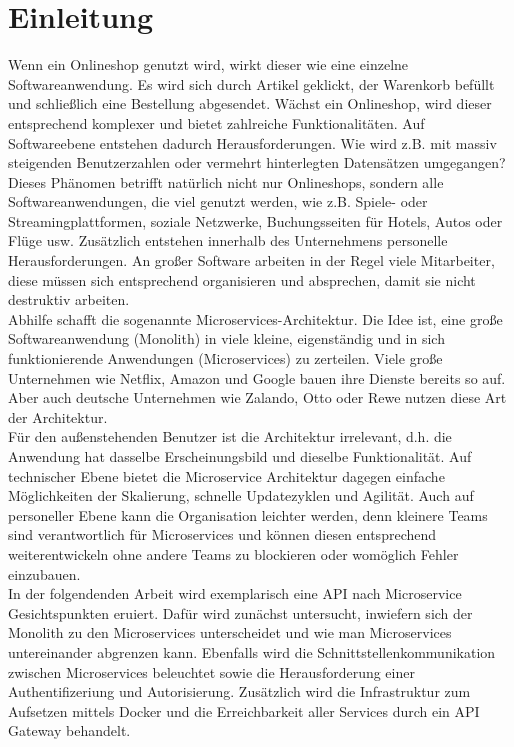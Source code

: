 \section{Einleitung}\label{sec:einleitung}

Wenn ein Onlineshop genutzt wird, wirkt dieser wie eine einzelne Softwareanwendung. Es wird sich durch Artikel geklickt, der Warenkorb befüllt und schließlich eine Bestellung abgesendet. Wächst ein Onlineshop, wird dieser entsprechend komplexer und bietet zahlreiche Funktionalitäten. Auf Softwareebene entstehen dadurch Herausforderungen. Wie wird z.B. mit massiv steigenden Benutzerzahlen oder vermehrt hinterlegten Datensätzen umgegangen? Dieses Phänomen betrifft natürlich nicht nur Onlineshops, sondern alle Softwareanwendungen, die viel genutzt werden, wie z.B. Spiele- oder Streamingplattformen, soziale Netzwerke, Buchungsseiten für Hotels, Autos oder Flüge usw. Zusätzlich entstehen innerhalb des Unternehmens personelle Herausforderungen. An großer Software arbeiten in der Regel viele Mitarbeiter, diese müssen sich entsprechend organisieren und absprechen, damit sie nicht destruktiv arbeiten.\\

Abhilfe schafft die sogenannte Microservices-Architektur. Die Idee ist, eine große Softwareanwendung (Monolith) in viele kleine, eigenständig und in sich funktionierende Anwendungen (Microservices) zu zerteilen. Viele große Unternehmen wie Netflix, Amazon und Google bauen ihre Dienste bereits so auf. Aber auch deutsche Unternehmen wie Zalando, Otto oder Rewe nutzen diese Art der Architektur.\\

Für den außenstehenden Benutzer ist die Architektur irrelevant, d.h. die Anwendung hat dasselbe Erscheinungsbild und dieselbe Funktionalität. Auf technischer Ebene bietet die Microservice Architektur dagegen einfache Möglichkeiten der Skalierung, schnelle Updatezyklen und Agilität. Auch auf personeller Ebene kann die Organisation leichter werden, denn kleinere Teams sind verantwortlich für Microservices und können diesen entsprechend weiterentwickeln ohne andere Teams zu blockieren oder womöglich Fehler einzubauen. \\

In der folgendenden Arbeit wird exemplarisch eine API nach Microservice Gesichtspunkten eruiert. Dafür wird zunächst untersucht, inwiefern sich der Monolith zu den Microservices unterscheidet und wie man Microservices untereinander abgrenzen kann. Ebenfalls wird die Schnittstellenkommunikation zwischen Microservices beleuchtet sowie die Herausforderung einer Authentifizeriung und Autorisierung. Zusätzlich wird die Infrastruktur zum Aufsetzen mittels Docker und die Erreichbarkeit aller Services durch ein API Gateway behandelt.\\ 


